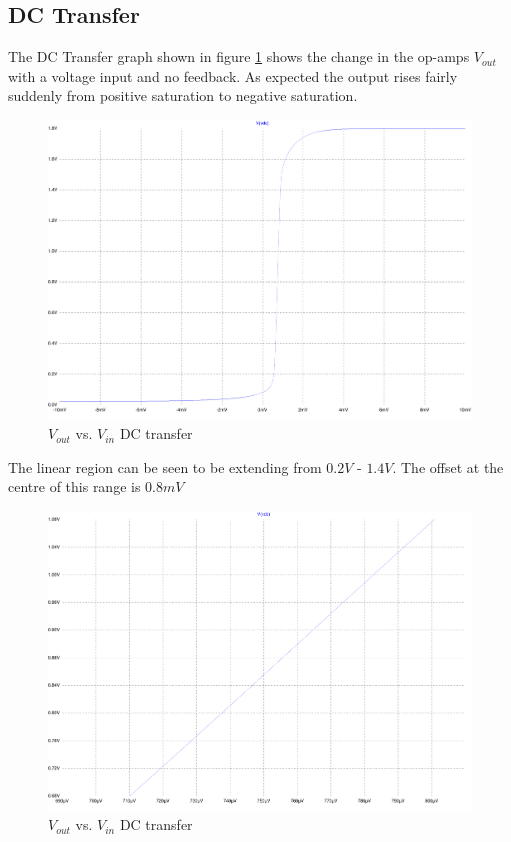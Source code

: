 \subsection{DC Transfer}

The DC Transfer graph shown in figure \ref{fig:DCtrans} shows the change in the op-amps $V_{out}$ with a voltage input and no feedback.
As expected the output rises fairly suddenly from positive saturation to negative saturation.

\begin{figure}[H]
	\centering
	\includegraphics[width=\textwidth]{./images/DCTransfer-out.pdf}
	\caption{$V_{out}$ vs. $V_{in}$ DC transfer}
	\label{fig:DCtrans}
\end{figure}

The linear region can be seen to be extending from $0.2V$ - $1.4V$.
The offset at the centre of this range is $0.8mV$

\begin{figure}[h]
	\centering
	\includegraphics[width=\textwidth]{./images/DCTransfer-zoom.pdf}
	\caption{$V_{out}$ vs. $V_{in}$ DC transfer}
	\label{fig:DCzoom}
\end{figure}


